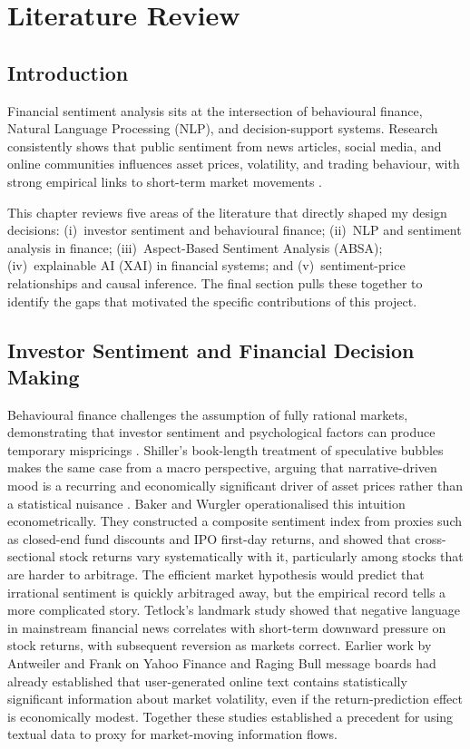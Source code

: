 \chapter{Literature Review}

\section{Introduction}

Financial sentiment analysis sits at the intersection of behavioural finance, Natural Language Processing (NLP), and decision-support systems. Research consistently shows that public sentiment from news articles, social media, and online communities influences asset prices, volatility, and trading behaviour, with strong empirical links to short-term market movements \citep{tetlock2007giving, bollen2011twitter}.

This chapter reviews five areas of the literature that directly shaped my design decisions: (i)~investor sentiment and behavioural finance; (ii)~NLP and sentiment analysis in finance; (iii)~Aspect-Based Sentiment Analysis (ABSA); (iv)~explainable AI (XAI) in financial systems; and (v)~sentiment-price relationships and causal inference. The final section pulls these together to identify the gaps that motivated the specific contributions of this project.

\section{Investor Sentiment and Financial Decision Making}

Behavioural finance challenges the assumption of fully rational markets, demonstrating that investor sentiment and psychological factors can produce temporary mispricings \citep{barberis2003behavioral, delong1990noise}. Shiller's book-length treatment of speculative bubbles makes the same case from a macro perspective, arguing that narrative-driven mood is a recurring and economically significant driver of asset prices rather than a statistical nuisance \citep{shiller2015irrational}. Baker and Wurgler \citep{baker2006investor} operationalised this intuition econometrically. They constructed a composite sentiment index from proxies such as closed-end fund discounts and IPO first-day returns, and showed that cross-sectional stock returns vary systematically with it, particularly among stocks that are harder to arbitrage.  The efficient market hypothesis \citep{fama1970efficient} would predict that irrational sentiment is quickly arbitraged away, but the empirical record tells a more complicated story.  Tetlock's landmark study \citep{tetlock2007giving} showed that negative language in mainstream financial news correlates with short-term downward pressure on stock returns, with subsequent reversion as markets correct.  Earlier work by Antweiler and Frank \citep{antweiler2004noise} on Yahoo Finance and Raging Bull message boards had already established that user-generated online text contains statistically significant information about market volatility, even if the return-prediction effect is economically modest.  Together these studies established a precedent for using textual data to proxy for market-moving information flows.

